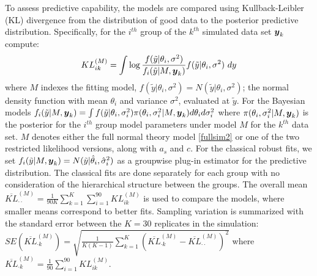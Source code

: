 \documentclass[ba]{imsart}
\newcommand{\by}{\mbox{\boldmath $y$}}
\begin{document}
To assess predictive capability, the models are compared using Kullback-Leibler (KL) divergence from the distribution of good data to the posterior predictive distribution. Specifically, for the $i^{th}$ group of the $k^{th}$ simulated data set $\by_{k}$ compute:
\begin{equation}
\label{kl}
KL^{(M)}_{ik} = \int \log \frac{f(\tilde y | \theta_{i}, \sigma^{2})}{f_{i}(\tilde y | M, \by_{k})}  f(\tilde y | \theta_{i}, \sigma^{2}) \ dy
\end{equation}
where $M$ indexes the fitting model, $f(\tilde y | \theta_{i}, \sigma^{2}) = N(\tilde y | \theta_{i}, \sigma^{2})$; the normal density function with mean $\theta_{i}$ and variance $\sigma^{2}$, evaluated at $\tilde y$. For the Bayesian models ${f_{i}(\tilde y | M, \by_{k})} = \int f(\tilde y |\theta_{i}, \sigma_{i}^{2}) \pi(\theta_{i}, \sigma^{2}_{i} | M, \by_{k})d\theta_{i}d\sigma^{2}_{i}$ where $\pi(\theta_{i}, \sigma^{2}_{i} | M, \by_{k})$ is the posterior for the $i^{th}$ group model parameters under model $M$ for the $k^{th}$ data set. $M$ denotes either the full normal theory model \eqref{fullsim2} or one of the two restricted likelihood versions, along with $a_{s}$ and $c$. For the classical robust fits, we set $f_{i}(\tilde y | M, \by_{k}) = N(\tilde y|\hat\theta_{i}, \hat\sigma^{2}_{i})$ as a groupwise plug-in estimator for the predictive distribution. The classical fits are done separately for each group with no consideration of the hierarchical structure between the groups. The overall mean $\overline{KL}^{(M)}_{{\cdot}{\cdot}} = \frac{1}{90K} \sum_{k = 1}^{K} \sum_{i=1}^{90} KL^{(M)}_{ik}$ is used to compare the models, where smaller means correspond to better fits. Sampling variation is summarized with the standard error between the $K=30$ replicates in the simulation:  $SE(\overline{KL}^{(M)}_{{\cdot} k}) = \sqrt{\frac{1}{K(K-1)}\sum_{k = 1}^{K} (\overline{KL}^{(M)}_{{\cdot} k} - \overline{KL}^{(M)}_{{\cdot}{\cdot}})^{2}}$ where $\overline{KL}^{(M)}_{{\cdot} k} = \frac{1}{90}\sum_{i = 1}^{90} KL^{(M)}_{ik}$.
 
\end{document}

